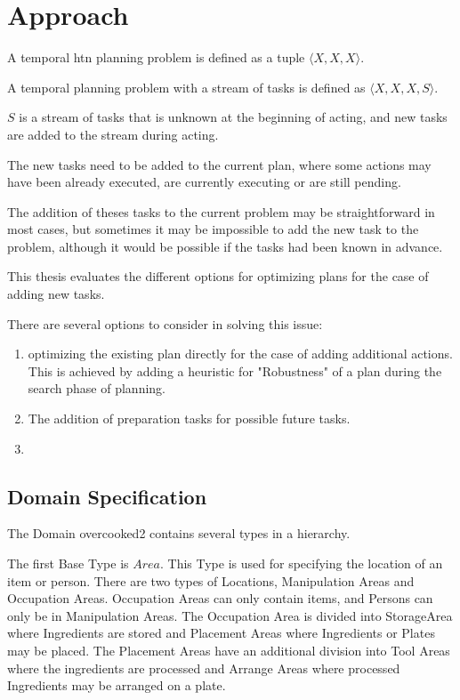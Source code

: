 \section{Approach}\label{sec:approach}


A temporal htn planning problem is defined as a tuple $\langle X,X,X \rangle$.

A temporal planning problem with a stream of tasks is defined as $\langle X,X,X,S \rangle$.

$S$ is a stream of tasks that is unknown at the beginning of acting, and new tasks are added to the stream during acting.

The new tasks need to be added to the current plan, where some actions may have been already executed, are currently executing or are still pending.

The addition of theses tasks to the current problem may be straightforward in most cases, but sometimes it may be impossible to add the new task to the problem, although it would be possible if the tasks had been known in advance.

This thesis evaluates the different options for optimizing plans for the case of adding new tasks.

There are several options to consider in solving this issue:

\begin{enumerate}
    \item optimizing the existing plan directly for the case of adding additional actions. This is achieved by adding a heuristic for "Robustness" of a plan during the search phase of planning.
    \item The addition of preparation tasks for possible future tasks. 
    \item {}
\end{enumerate}


\subsection{Domain Specification}

The Domain overcooked2 contains several types in a hierarchy.

The first Base Type is $Area$.
This Type is used for specifying the location of an item or person. There are two types of Locations, Manipulation Areas and Occupation Areas.
Occupation Areas can only contain items, and Persons can only be in Manipulation Areas.
The Occupation Area is divided into StorageArea where Ingredients are stored and Placement Areas where Ingredients or Plates may be placed.
The Placement Areas have an additional division into Tool Areas where the ingredients are processed and Arrange Areas where processed Ingredients may be arranged on a plate.

